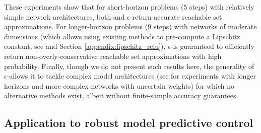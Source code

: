 \documentclass[12pt]{l4dc2022} %
\begin{document}
These experiments show that for short-horizon problems ($5$ steps) with relatively simple network architectures, both \reachlp and $\epsilon$-\randup return accurate reachable set approximations. 
For longer-horizon problems ($9$ steps) with networks of moderate dimensions (which allows using existing methods to pre-compute a Lipschitz constant, see \citep{Fazlyab2019} and Section \ref{appendix:lipschitz_relu}), $\epsilon$-\randup is guaranteed to  efficiently return non-overly-conservative reachable set approximations with high probability. %
Finally, though we do not present such results here, 
the generality of $\epsilon$-\randup allows it to tackle complex model architectures (see \citep{LewEtAl2022} for experiments with longer horizons and more complex networks with uncertain weights) for which no alternative methods exist, albeit without finite-sample accuracy guarantees. 


% 
% 

 

% 
% 
% 
% 
% 
% 
% 
% 
% 
% 
% 
% 
% 



% 
% 
% 
% 
% 
% 
% 
% 
% 
% 
% 
% 
% 
% 
% 
% 



	
	










































\vspace{-1mm}

\subsection{Application to robust model predictive control}\label{sec:results:mpc}
\end{document}

